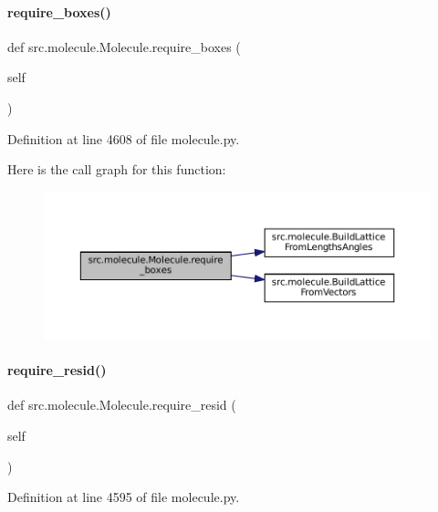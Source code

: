 \paragraph{\texorpdfstring{require\+\_\+boxes()}{require\_boxes()}}
{\footnotesize\ttfamily def src.\+molecule.\+Molecule.\+require\+\_\+boxes (\begin{DoxyParamCaption}\item[{}]{self }\end{DoxyParamCaption})}



Definition at line 4608 of file molecule.\+py.

Here is the call graph for this function\+:
\nopagebreak
\begin{figure}[H]
\begin{center}
\leavevmode
\includegraphics[width=350pt]{classsrc_1_1molecule_1_1Molecule_ab72729cb3e6b2ed086669142c1409ed4_cgraph}
\end{center}
\end{figure}
\mbox{\label{classsrc_1_1molecule_1_1Molecule_af74bcae2931e36e08ff33037b1b0fa37}} 
\paragraph{\texorpdfstring{require\+\_\+resid()}{require\_resid()}}
{\footnotesize\ttfamily def src.\+molecule.\+Molecule.\+require\+\_\+resid (\begin{DoxyParamCaption}\item[{}]{self }\end{DoxyParamCaption})}



Definition at line 4595 of file molecule.\+py.

\mbox{\label{classsrc_1_1molecule_1_1Molecule_a68eee3cd2b86790c0cb2954c8310bd29}} 
